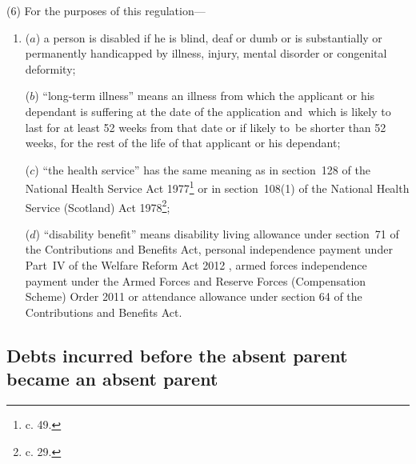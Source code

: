 \documentclass[12pt,a4paper]{article}
\begin{document}
(6) For the purposes of this regulation—
\begin{enumerate}\item[]
($a$) a person is disabled if he is blind, deaf or dumb or is substantially or
permanently handicapped by illness, injury, mental disorder or congenital
deformity;

($b$) “long-term illness” means an illness from which the applicant or his
dependant is suffering at the date of the application and~which is likely to
last for at least 52 weeks from that date or if likely to~be shorter than 52
weeks, for the rest of the life of that applicant or his dependant;

($c$) “the health service” has the same meaning as in section~128 of the National
Health Service Act 1977\footnote{ c. 49.} or in section~108(1) of the National Health Service
(Scotland) Act 1978\footnote{ c. 29.};

($d$) “disability benefit” means disability living allowance under section~71 of the Contributions and Benefits Act, personal independence payment under Part~IV of the Welfare Reform Act 2012%
, armed forces independence payment under the Armed Forces and Reserve Forces (Compensation Scheme) Order 2011  %
or attendance allowance under section 64 of the Contributions and Benefits Act.
\end{enumerate}


\subsection[16. Debts incurred before the absent parent became an absent parent]{Debts incurred before the absent parent became an absent parent}
\end{document}
